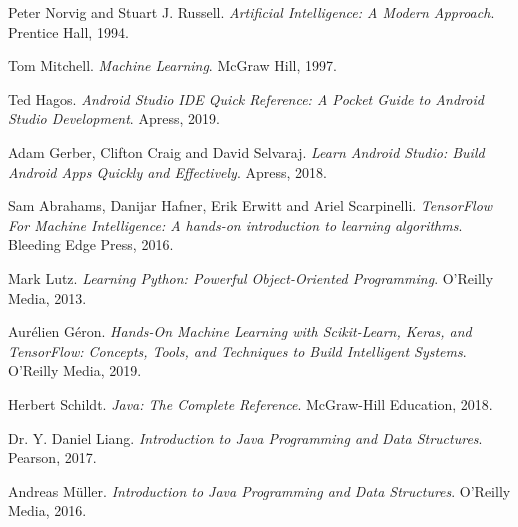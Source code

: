 \documentclass[14pt]{report}
\begin{document}
	\renewcommand{\bibname}{References}
	\begin{thebibliography}{9}
		Peter Norvig and Stuart J. Russell.
		\textit{Artificial Intelligence: A Modern Approach}. 
		Prentice Hall, 1994.
	
		Tom Mitchell.
		\textit{Machine Learning}. 
		McGraw Hill, 1997.

		Ted Hagos.
		\textit{Android Studio IDE Quick Reference: A Pocket Guide to Android Studio Development}. 
		Apress, 2019.

		Adam Gerber, Clifton Craig and David Selvaraj.
		\textit{Learn Android Studio: Build Android Apps Quickly and Effectively}. 
		Apress, 2018.

		Sam Abrahams, Danijar Hafner, Erik Erwitt and Ariel Scarpinelli.
		\textit{TensorFlow For Machine Intelligence: A hands-on introduction to learning algorithms}. 
		Bleeding Edge Press, 2016.

		Mark Lutz.
		\textit{Learning Python: Powerful Object-Oriented Programming}. 
		O'Reilly Media, 2013.

		Aur\'elien G\'eron.
		\textit{Hands-On Machine Learning with Scikit-Learn, Keras, and TensorFlow: Concepts, Tools, and Techniques to Build Intelligent Systems}. 
		O'Reilly Media, 2019.

		Herbert Schildt.
		\textit{Java: The Complete Reference}. 
		McGraw-Hill Education, 2018.

		Dr. Y. Daniel Liang.
		\textit{Introduction to Java Programming and Data Structures}. 
		Pearson, 2017.

		Andreas Müller.
		\textit{Introduction to Java Programming and Data Structures}. 
		O'Reilly Media, 2016.


	\end{thebibliography}

	\newpage
\end{document}
